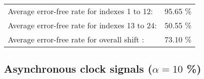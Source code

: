 \begin{table}[h]
\begin{center}
\begin{tabular}{|c|c|c|c|c|}
\end{tabular}


\flushleft
\begin{tabular}{l l}
Average error-free rate for indexes  1 to 12: & 95.65 \% \\
Average error-free rate for indexes 13 to 24: & 50.55 \% \\
Average error-free rate for overall shift   : & 73.10 \% \\

\end{tabular}


\end{center}
\end{table}




\pagebreak
\subsection{Asynchronous clock signals ($\alpha=10$ \%)}

